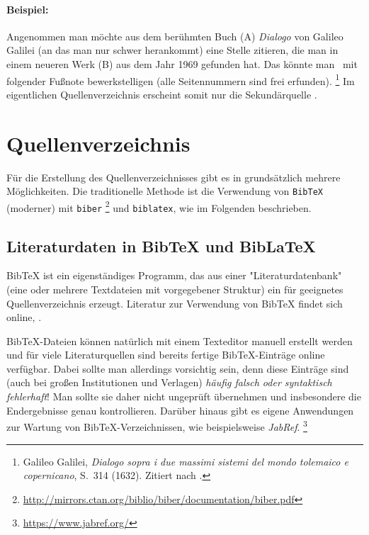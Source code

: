 \paragraph{Beispiel:} Angenommen man möchte aus dem berühmten Buch (\textrm{A}) 
\emph{Dialogo} von Galileo Galilei (an das man nur schwer herankommt) eine Stelle
zitieren, die man in einem neueren Werk (\textrm{B}) aus dem Jahr 1969 gefunden 
hat. Das könnte man \zB\ mit folgender Fußnote bewerkstelligen (alle Seitennummern
sind frei erfunden).%
\footnote{Galileo Galilei, \emph{Dialogo sopra i due massimi sistemi del
mondo tolemaico e copernicano}, S.~314 (1632). Zitiert nach
\cite[S.~59]{Hemleben1969}.}
Im eigentlichen Quellenverzeichnis erscheint somit nur die Sekundärquelle
\cite{Hemleben1969}.


\section{Quellenverzeichnis}
\label{sec:quellenverzeichnis}

Für die Erstellung des Quellenverzeichnisses gibt es in \latex grundsätzlich
mehrere Möglichkeiten. Die traditionelle Methode ist die Verwendung von
\texttt{BibTeX} \cite{Patashnik1988} \bzw (moderner) mit \texttt{biber}%
\footnote{\url{http://mirrors.ctan.org/biblio/biber/documentation/biber.pdf}}
und \texttt{biblatex}, wie im Folgenden beschrieben.

\subsection{Literaturdaten in BibTeX und BibLaTeX}
\label{sec:bibtex}

BibTeX ist ein eigenständiges Programm, das aus einer "Literaturdatenbank"
(eine oder mehrere Textdateien mit vorgegebener Struktur) ein für \latex
geeignetes Quellenverzeichnis erzeugt. Literatur zur Verwendung von BibTeX
findet sich online, \zB \cite{Feder2006, Patashnik1988}.

BibTeX-Dateien können natürlich mit einem Texteditor manuell erstellt werden
und für viele Literaturquellen sind bereits fertige BibTeX-Einträge online
verfügbar. Dabei sollte man allerdings vorsichtig sein, denn diese Einträge
sind (auch bei großen Institutionen und Verlagen) \emph{häufig falsch oder
syntaktisch fehlerhaft}! Man sollte sie daher nicht ungeprüft übernehmen und
insbesondere die Endergebnisse genau kontrollieren. Darüber hinaus gibt es
eigene Anwendungen zur Wartung von BibTeX-Verzeichnissen, wie beispielsweise
\emph{JabRef}.%
\footnote{\url{https://www.jabref.org/}}

